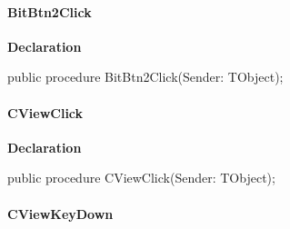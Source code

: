 \documentclass{report}
\newif\ifpdf
\begin{document}
\paragraph*{BitBtn2Click}\hspace*{\fill}

\label{swcatalog.TSCForm-BitBtn2Click}
\begin{list}{}{
\setlength{\itemindent}{0cm}
\setlength{\listparindent}{0cm}
\setlength{\leftmargin}{\evensidemargin}
\addtolength{\leftmargin}{\tmplength}
\settowidth{\labelsep}{X}
\addtolength{\leftmargin}{\labelsep}
\setlength{\labelwidth}{\tmplength}
}
\item[\textbf{Declaration}\hfill]
\ifpdf
\begin{flushleft}
\fi
\begin{ttfamily}
public procedure BitBtn2Click(Sender: TObject);\end{ttfamily}

\ifpdf
\end{flushleft}
\fi

\end{list}
\paragraph*{CViewClick}\hspace*{\fill}

\label{swcatalog.TSCForm-CViewClick}
\begin{list}{}{
\setlength{\itemindent}{0cm}
\setlength{\listparindent}{0cm}
\setlength{\leftmargin}{\evensidemargin}
\addtolength{\leftmargin}{\tmplength}
\settowidth{\labelsep}{X}
\addtolength{\leftmargin}{\labelsep}
\setlength{\labelwidth}{\tmplength}
}
\item[\textbf{Declaration}\hfill]
\ifpdf
\begin{flushleft}
\fi
\begin{ttfamily}
public procedure CViewClick(Sender: TObject);\end{ttfamily}

\ifpdf
\end{flushleft}
\fi

\end{list}
\paragraph*{CViewKeyDown}\hspace*{\fill}
\end{document}
